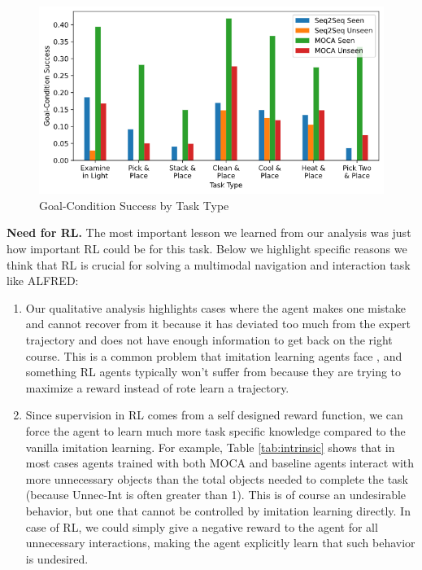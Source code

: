 \documentclass[11pt,a4paper]{article}
\begin{document}
\begin{figure}[H]
\centering
\includegraphics[scale=0.33]{figures/gcs_by_type.png}
\caption{Goal-Condition Success by Task Type}
\label{fig:gcs-by-type}
\end{figure}


\textbf{Need for RL.} The most important lesson we learned from our analysis was just how important RL could be for this task. Below we highlight specific reasons we think that RL is crucial for solving a multimodal navigation and interaction task like ALFRED:

\begin{enumerate}
    \item Our qualitative analysis highlights cases where the agent makes one mistake and cannot recover from it because it has deviated too much from the expert trajectory and does not have enough information to get back on the right course. This is a common problem that imitation learning agents face \cite{ross2011reduction}, and something RL agents typically won't suffer from because they are trying to maximize a reward instead of rote learn a trajectory.
    \item Since supervision in RL comes from a self designed reward function, we can force the agent to learn much more task specific knowledge compared to the vanilla imitation learning. For example, Table \ref{tab:intrinsic} shows that in most cases agents trained with both MOCA and baseline agents interact with more unnecessary objects than the total objects needed to complete the task (because Unnec-Int is often greater than 1). This is of course an undesirable behavior, but one that cannot be controlled by imitation learning directly. In case of RL, we could simply give a negative reward to the agent for all unnecessary interactions, making the agent explicitly learn that such behavior is undesired.
\end{enumerate}
\end{document}
